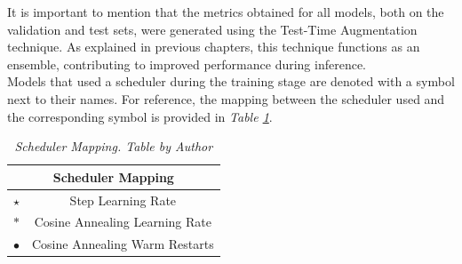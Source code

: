 \newpage

It is important to mention that the metrics obtained for all models,
both on the validation and test sets, were generated using the Test-Time Augmentation technique.
As explained in previous chapters, this technique functions as an ensemble, contributing to improved performance during inference. \\

Models that used a scheduler during the training stage are denoted with a symbol next to their names.
For reference, the mapping between the scheduler used and the corresponding symbol is provided in \textit{Table \ref{table:scheduler-mapping}}.

\begin{table}[H]
	\centering
	\begin{tabular}{cc}
		\toprule
		\multicolumn{2}{c}{\textbf{Scheduler Mapping}} \\
		\midrule
		$\star$     & Step Learning Rate \\
		$\ast$      & Cosine Annealing Learning Rate \\
	  $\bullet$   & Cosine Annealing Warm Restarts \\
		\bottomrule
	\end{tabular}
  \caption[Scheduler Mapping]
  {\textit{Scheduler Mapping.
  Table by Author}}
	\label{table:scheduler-mapping}
\end{table}

\newpage

